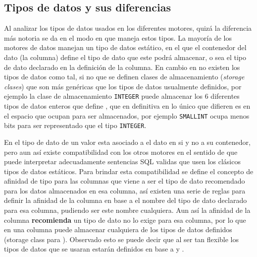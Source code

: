 \subsection{Tipos de datos y sus diferencias}
\label{subsection:datatypes}
Al analizar los tipos de datos usados en los diferentes motores, quizá la diferencia más notoria se da en el modo en que \s maneja estos tipos. La mayoría de los motores de datos manejan un tipo de datos estático, en el que el contenedor del dato (la columna) define el tipo de dato que este podrá almacenar, o sea el tipo de dato declarado en la definición de la columna. En cambio en \s no existen los tipos de datos como tal, si no que se definen clases de almacenamiento\cite{sqlite:datatypes} (\textit{storage clases}) que son más genéricas que los tipos de datos usualmente definidos, por ejemplo la clase de almacenamiento \verb=INTEGER= puede almacenar los 6 diferentes tipos de datos enteros que define \m , que en definitiva en lo único que difieren es en el espacio que ocupan para ser almacenados, por ejemplo \verb=SMALLINT= ocupa menos bits para ser representado que el tipo \verb=INTEGER=.

En \s el tipo de dato de un valor esta asociado a el dato en si y no a su contenedor, pero aun así existe compatibilidad con los otros motores en el sentido de que \s puede interpretar adecuadamente sentencias SQL validas que usen los clásicos tipos de datos estáticos. Para brindar esta compatibilidad se define el concepto de afinidad de tipo para las columnas que viene a ser el tipo de dato recomendado para los datos almacenados en esa columna, así existen una serie de reglas para definir la afinidad de la columna en base a el nombre del tipo de dato declarado para esa columna, pudiendo ser este nombre cualquiera. Aun así la afinidad de la columna \textbf{recomienda} un tipo de dato no lo exige para esa columna, por lo que en \s una columna puede almacenar cualquiera de los tipos de datos definidos (storage class para \s). Observado esto se puede decir que al ser \s tan flexible los tipos de datos que se usaran estarán definidos en base a \m y \p.
 

